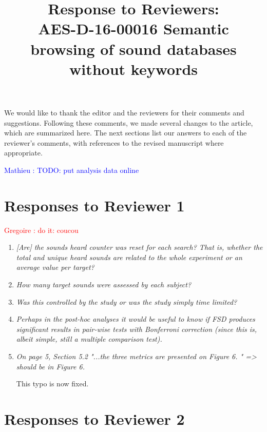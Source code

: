 \documentclass[10pt]{article}
\title{Response to Reviewers: \\ AES-D-16-00016
Semantic browsing of sound databases without keywords}
\newcommand{\gl}[1]{\textcolor{red}{Gregoire : #1}}
\newcommand{\ml}[1]{\textcolor{blue}{ Mathieu : #1}}
\begin{document}
\maketitle

We would like to thank the editor and the reviewers for their comments and suggestions. Following these comments, we made several changes to the article, which are summarized here. The next sections list our answers to each of the reviewer’s comments, with references to the revised manuscript where appropriate.

\ml{TODO: put analysis data online}

\section{Responses to Reviewer 1}

\gl{do it: coucou}

\begin{enumerate}

\item \emph{[Are] the sounds heard counter was reset for each search? That is, whether the total and unique heard sounds are related to the whole experiment or an average value per target?}

\item \emph{How many target sounds were assessed by each subject?}

\item \emph{Was this controlled by the study or was the study simply time limited?}

\item \emph{Perhaps in the post-hoc analyses it would be useful to know if FSD produces significant results in pair-wise tests with Bonferroni correction (since this is, albeit simple, still a multiple comparison test).}

\item \emph{On page 5, Section 5.2  "...the three metrics are presented on Figure 6. " => should be in Figure 6.}

This typo is now fixed.

\end{enumerate}

\section{Responses to Reviewer 2}
\end{document}
